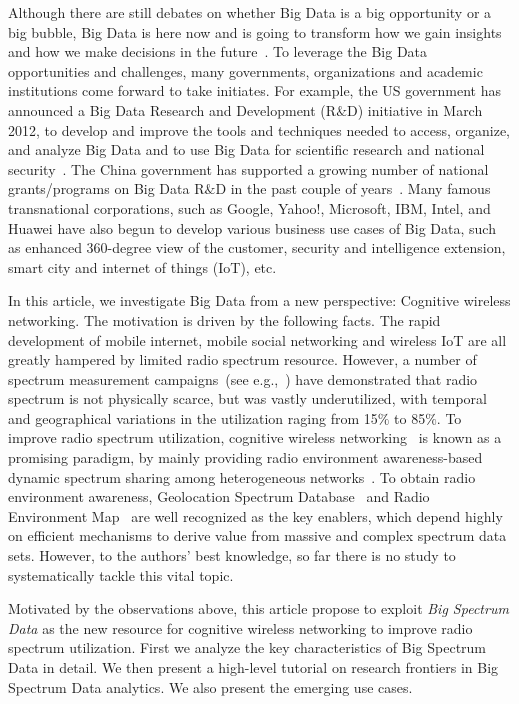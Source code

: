 \documentclass[12pt,draftcls,journal,letterpaper,oneside,onecolumn]{IEEEtran}
\begin{document}
Although there are still debates on whether Big Data is a big opportunity or a big bubble, Big Data is here now and is going to transform how we gain insights and how we make decisions in the future~\cite{Viktor}. To leverage the Big Data opportunities and challenges, many governments, organizations and academic institutions come forward to take initiates. For example, the US government has announced a Big Data Research and Development (R$\&$D) initiative in March 2012, to develop and improve the tools and techniques needed to access, organize, and analyze Big Data and to use Big Data for scientific research and national security~\cite{White-house}. The China government has supported a growing number of national grants/programs on Big Data R$\&$D in the past couple of years~\cite{China-NSF}. Many famous transnational corporations, such as Google, Yahoo!, Microsoft, IBM, Intel, and Huawei have also begun to develop various business use cases of Big Data, such as enhanced 360-degree view of the customer, security and intelligence extension, smart city and internet of things (IoT), etc.




In this article, we investigate Big Data from a new perspective: Cognitive wireless networking. The motivation is driven by the following facts. The rapid development of mobile internet, mobile social networking and wireless IoT are all greatly hampered by limited radio spectrum resource. However, a number of spectrum measurement campaigns~(see e.g.,~\cite{Spectrum_prediction,Spectrum_models}) have demonstrated that radio spectrum is not physically scarce, but was vastly underutilized, with temporal and geographical variations in the utilization raging from 15$\%$ to 85$\%$. To improve radio spectrum utilization, cognitive wireless networking~\cite{Haykin_2005} is known as a promising paradigm, by mainly providing radio environment awareness-based dynamic spectrum sharing among heterogeneous networks~\cite{SPMag2013}. To obtain radio environment awareness, Geolocation Spectrum Database~\cite{Senseless_2012} and Radio Environment Map~\cite{REM-MassiveData} are well recognized as the key enablers, which depend highly on efficient mechanisms to derive value from massive and complex spectrum data sets. However, to the authors' best knowledge, so far there is no study to systematically tackle this vital topic.



Motivated by the observations above, this article propose to exploit \emph{Big Spectrum Data} as the new resource for cognitive wireless networking to improve radio spectrum utilization. First we analyze the key characteristics of Big Spectrum Data in detail. We then present a high-level tutorial on research frontiers in Big Spectrum Data analytics. We also present the emerging use cases.
\\
\end{document}
